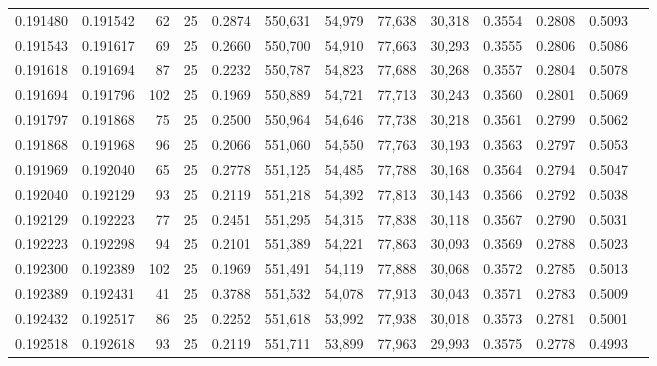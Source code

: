 \begin{tabular}{rrrrrrrrrrrrr}
0.191480 & 0.191542 &    62 &  25 &                                     0.2874 & 550,631 &  54,979 &  77,638 &  30,318 & 0.3554 & 0.2808 & 0.5093 \\
0.191543 & 0.191617 &    69 &  25 &                                     0.2660 & 550,700 &  54,910 &  77,663 &  30,293 & 0.3555 & 0.2806 & 0.5086 \\
0.191618 & 0.191694 &    87 &  25 &                                     0.2232 & 550,787 &  54,823 &  77,688 &  30,268 & 0.3557 & 0.2804 & 0.5078 \\
0.191694 & 0.191796 &   102 &  25 &                                     0.1969 & 550,889 &  54,721 &  77,713 &  30,243 & 0.3560 & 0.2801 & 0.5069 \\
0.191797 & 0.191868 &    75 &  25 &                                     0.2500 & 550,964 &  54,646 &  77,738 &  30,218 & 0.3561 & 0.2799 & 0.5062 \\
0.191868 & 0.191968 &    96 &  25 &                                     0.2066 & 551,060 &  54,550 &  77,763 &  30,193 & 0.3563 & 0.2797 & 0.5053 \\
0.191969 & 0.192040 &    65 &  25 &                                     0.2778 & 551,125 &  54,485 &  77,788 &  30,168 & 0.3564 & 0.2794 & 0.5047 \\
0.192040 & 0.192129 &    93 &  25 &                                     0.2119 & 551,218 &  54,392 &  77,813 &  30,143 & 0.3566 & 0.2792 & 0.5038 \\
0.192129 & 0.192223 &    77 &  25 &                                     0.2451 & 551,295 &  54,315 &  77,838 &  30,118 & 0.3567 & 0.2790 & 0.5031 \\
0.192223 & 0.192298 &    94 &  25 &                                     0.2101 & 551,389 &  54,221 &  77,863 &  30,093 & 0.3569 & 0.2788 & 0.5023 \\
0.192300 & 0.192389 &   102 &  25 &                                     0.1969 & 551,491 &  54,119 &  77,888 &  30,068 & 0.3572 & 0.2785 & 0.5013 \\
0.192389 & 0.192431 &    41 &  25 &                                     0.3788 & 551,532 &  54,078 &  77,913 &  30,043 & 0.3571 & 0.2783 & 0.5009 \\
0.192432 & 0.192517 &    86 &  25 &                                     0.2252 & 551,618 &  53,992 &  77,938 &  30,018 & 0.3573 & 0.2781 & 0.5001 \\
0.192518 & 0.192618 &    93 &  25 &                                     0.2119 & 551,711 &  53,899 &  77,963 &  29,993 & 0.3575 & 0.2778 & 0.4993 \\

\end{tabular}
